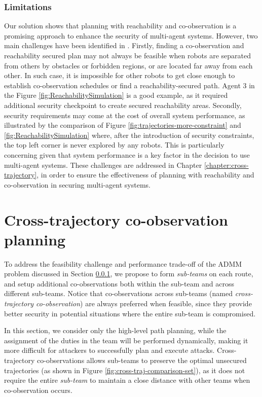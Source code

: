 \documentclass[journal]{IEEEtran}  %
\begin{document}
\subsubsection{Limitations}\label{sec:reachability-discussion}
Our solution shows that planning with reachability and co-observation is a promising approach to enhance the security of multi-agent systems. However, two main challenges have been identified in \cite{wardega2023hola}. Firstly, finding a co-observation and reachability secured plan may not always be feasible when robots are separated from others by obstacles or forbidden regions, or are located far away from each other. In such case, it is impossible for other robots to get close enough to establish co-observation schedules or find a reachability-secured path. Agent 3 in the Figure \ref{fig:ReachabilitySimulation} is a good example, as it required additional security checkpoint to create secured reachability areas. Secondly, security requirements may come at the cost of overall system performance, as illustrated by the comparison of Figure \ref{fig:trajectories-more-constraint} and \ref{fig:ReachabilitySimulation} where, after the introduction of security constraints, the top left corner is never explored by any robots. This is particularly concerning given that system performance is a key factor in the decision to use multi-agent systems. These challenges are addressed in Chapter \ref{chapter:cross-trajectory}, in order to ensure the effectiveness of planning with reachability and co-observation in securing multi-agent systems.

\section{Cross-trajectory co-observation planning}

To address the feasibility challenge and performance trade-off of the ADMM problem discussed in Section \ref{sec:reachability-discussion}, we propose to form \emph{sub-teams} on each route, and setup additional co-observations both within the sub-team and across different sub-teams. Notice that co-observations across sub-teams (named \emph{cross-trajectory co-observation}) are always preferred when feasible, since they provide better security in potential situations where the entire sub-team is compromised.

In this section, we consider only the high-level path planning, while the assignment of the duties in the team will be performed dynamically, making it more difficult for attackers to successfully plan and execute attacks. Cross-trajectory co-observations allows sub-teams to preserve the optimal unsecured trajectories (as shown in Figure \ref{fig:cross-traj-comparison-set}), as it does not require the entire \emph{sub-team} to maintain a close distance with other teams when co-observation occurs. 
\end{document}
